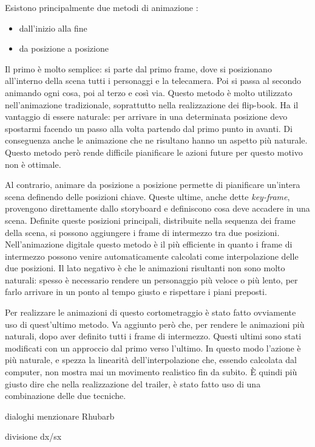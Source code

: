 Esistono principalmente due metodi di animazione \cite{Williams:2009:ASK:1823185}:
\begin{itemize}
    \item dall'inizio alla fine
    \item da posizione a posizione
\end{itemize}
Il primo è molto semplice: si parte dal primo frame, dove si posizionano all'interno della scena tutti i personaggi e la telecamera. Poi si passa al secondo animando ogni cosa, poi al terzo e così via. 
Questo metodo è molto utilizzato nell'animazione tradizionale, soprattutto nella realizzazione dei flip-book.
Ha il vantaggio di essere naturale: per arrivare in una determinata posizione devo spostarmi facendo un passo alla volta partendo dal primo punto in avanti.
Di conseguenza anche le animazione che ne risultano hanno un aspetto più naturale.
Questo metodo però rende difficile pianificare le azioni future per questo motivo non è ottimale.

Al contrario, animare da posizione a posizione permette di pianificare un'intera scena definendo delle posizioni chiave.
Queste ultime, anche dette \emph{key-frame}, provengono direttamente dallo storyboard e definiscono cosa deve accadere in una scena.
Definite queste posizioni principali, distribuite nella sequenza dei frame della scena, si possono aggiungere i frame di intermezzo tra due posizioni.
Nell'animazione digitale questo metodo è il più efficiente in quanto i frame di intermezzo possono venire automaticamente calcolati come interpolazione delle due posizioni.
Il lato negativo è che le animazioni risultanti non sono molto naturali: spesso è necessario rendere un personaggio più veloce o più lento, per farlo arrivare in un ponto al tempo giusto e rispettare i piani preposti.

Per realizzare le animazioni di questo cortometraggio è stato fatto ovviamente uso di quest'ultimo metodo.
Va aggiunto però che, per rendere le animazioni più naturali, dopo aver definito tutti i frame di intermezzo. Questi ultimi sono stati modificati con un approccio dal primo verso l'ultimo. In questo modo l'azione è più naturale, e spezza la linearità dell'interpolazione che, essendo calcolata dal computer, non mostra mai un movimento realistico fin da subito. È quindi più giusto dire che nella realizzazione del trailer, è stato fatto uso di una combinazione delle due tecniche.

dialoghi
menzionare Rhubarb

divisione dx/sx

